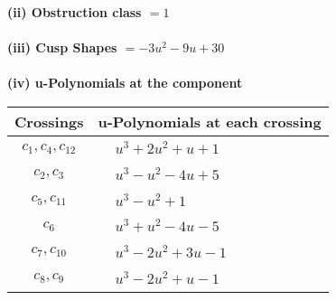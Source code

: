 \documentclass[1p]{elsarticle_modified}
\theoremstyle{definition}
\begin{document}
\flushleft \textbf{(ii) Obstruction class $= 1$}\\~\\
\flushleft \textbf{(iii) Cusp Shapes $= -3 u^2-9 u+30$}\\~\\
\newpage\renewcommand{\arraystretch}{1}
\flushleft \textbf{(iv) u-Polynomials at the component}\newline \\
\begin{tabular}{m{50pt}|m{274pt}}
Crossings & \hspace{64pt}u-Polynomials at each crossing \\
\hline $$\begin{aligned}c_{1},c_{4},c_{12}\end{aligned}$$&$\begin{aligned}
&u^3+2 u^2+u+1
\end{aligned}$\\
\hline $$\begin{aligned}c_{2},c_{3}\end{aligned}$$&$\begin{aligned}
&u^3- u^2-4 u+5
\end{aligned}$\\
\hline $$\begin{aligned}c_{5},c_{11}\end{aligned}$$&$\begin{aligned}
&u^3- u^2+1
\end{aligned}$\\
\hline $$\begin{aligned}c_{6}\end{aligned}$$&$\begin{aligned}
&u^3+u^2-4 u-5
\end{aligned}$\\
\hline $$\begin{aligned}c_{7},c_{10}\end{aligned}$$&$\begin{aligned}
&u^3-2 u^2+3 u-1
\end{aligned}$\\
\hline $$\begin{aligned}c_{8},c_{9}\end{aligned}$$&$\begin{aligned}
&u^3-2 u^2+u-1
\end{aligned}$\\
\hline
\end{tabular}\\~\\
\end{document}
